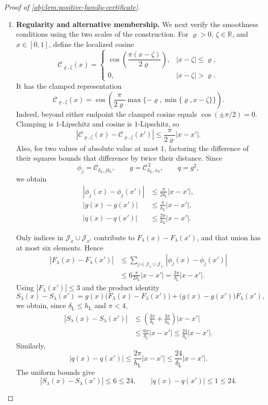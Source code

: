 \documentclass[11pt]{article}
\begin{document}
\begin{proof}[Proof of \cref{obj:lem:positive-family-certificate}]
\begin{enumerate}
\item \textbf{Regularity and alternative membership.}
We next verify the smoothness conditions using the two scales of the
construction. For \(\varrho>0\), \(\zeta\in\mathbb R\), and
\(x\in[0,1]\), define the localized cosine
\[
\mathcal C_{\varrho,\zeta}(x)=
\begin{cases}
\cos\!\left(\dfrac{\pi(x-\zeta)}{2\varrho}\right),
   &|x-\zeta|\le\varrho,\\
0,&|x-\zeta|>\varrho.
\end{cases}
\]
It has the clamped representation
\[
\mathcal C_{\varrho,\zeta}(x)
=\cos\!\left(
 \frac{\pi}{2\varrho}
 \max\{-\varrho,\min\{\varrho,x-\zeta\}\}\right).
\]
Indeed, beyond either endpoint the clamped cosine equals
\(\cos(\pm\pi/2)=0\). Clamping is \(1\)-Lipschitz and cosine is
\(1\)-Lipschitz, so
\[
|\mathcal C_{\varrho,\zeta}(x)
 -\mathcal C_{\varrho,\zeta}(x')|
\le\frac{\pi}{2\varrho}|x-x'|.
\]
Also, for two values of absolute value at most \(1\), factoring the
difference of their squares bounds that difference by twice their
distance. Since
\[
\phi_j=\mathcal C_{\delta_{\mathrm L},j\delta_{\mathrm L}},
\qquad
g=\mathcal C_{h_{\mathrm L},x_0}^{\,2},
\qquad q=g^2,
\]
we obtain
\[
\begin{aligned}
|\phi_j(x)-\phi_j(x')|
 &\le\frac{\pi}{2\delta_{\mathrm L}}|x-x'|,\\
|g(x)-g(x')|
 &\le\frac{\pi}{h_{\mathrm L}}|x-x'|,\\
|q(x)-q(x')|
 &\le\frac{2\pi}{h_{\mathrm L}}|x-x'|.
\end{aligned}
\]

Only indices in \(\mathcal J_x\cup\mathcal J_{x'}\) contribute to
\(F_\lambda(x)-F_\lambda(x')\), and that union has at most six
elements. Hence
\[
\begin{aligned}
|F_\lambda(x)-F_\lambda(x')|
&\le\sum_{j\in\mathcal J_x\cup\mathcal J_{x'}}
                       |\phi_j(x)-\phi_j(x')|\\
&\le6\frac{\pi}{2\delta_{\mathrm L}}|x-x'|
=\frac{3\pi}{\delta_{\mathrm L}}|x-x'|.
\end{aligned}
\]
Using \(|F_\lambda(x')|\le3\) and the product identity
\[
S_\lambda(x)-S_\lambda(x')
=g(x)\bigl(F_\lambda(x)-F_\lambda(x')\bigr)
 +\bigl(g(x)-g(x')\bigr)F_\lambda(x'),
\]
we obtain, since \(\delta_{\mathrm L}\le h_{\mathrm L}\) and
\(\pi<4\),
\[
\begin{aligned}
|S_\lambda(x)-S_\lambda(x')|
&\le\left(\frac{3\pi}{\delta_{\mathrm L}}
                  +\frac{3\pi}{h_{\mathrm L}}\right)|x-x'|\\
&\le\frac{6\pi}{\delta_{\mathrm L}}|x-x'|
\le\frac{24}{\delta_{\mathrm L}}|x-x'|.
\end{aligned}
\]
Similarly,
\[
|q(x)-q(x')|
\le\frac{2\pi}{h_{\mathrm L}}|x-x'|
\le\frac{24}{\delta_{\mathrm L}}|x-x'|.
\]
The uniform bounds give
\[
|S_\lambda(x)-S_\lambda(x')|\le6\le24,
\qquad
|q(x)-q(x')|\le1\le24.
\]


\end{enumerate}
\end{proof}
\end{document}
